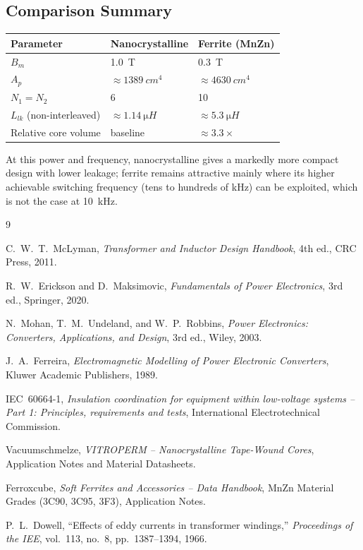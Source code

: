 \documentclass[11pt,a4paper]{article}
\begin{document}
\subsection*{Comparison Summary}
\begin{center}
\begin{tabular}{@{}lll@{}}
\toprule
Parameter & Nanocrystalline & Ferrite (MnZn) \\
\midrule
$B_m$ & \SI{1.0}{T} & \SI{0.3}{T} \\
$A_p$ & $\approx\SI{1389}{cm^4}$ & $\approx\SI{4630}{cm^4}$ \\
$N_1=N_2$ & 6 & 10 \\
$L_{lk}$ (non-interleaved) & $\approx\SI{1.14}{\micro H}$ & $\approx\SI{5.3}{\micro H}$ \\
Relative core volume & baseline & $\approx 3.3\times$ \\
\bottomrule
\end{tabular}
\end{center}
At this power and frequency, nanocrystalline gives a markedly more compact
design with lower leakage; ferrite remains attractive mainly where its higher
achievable switching frequency (tens to hundreds of kHz) can be exploited, which
is not the case at \SI{10}{kHz}.

\begin{thebibliography}{9}

C.~W.~T.~McLyman, \textit{Transformer and Inductor Design Handbook}, 4th ed.,
CRC Press, 2011.

R.~W.~Erickson and D.~Maksimovic, \textit{Fundamentals of Power Electronics},
3rd ed., Springer, 2020.

N.~Mohan, T.~M.~Undeland, and W.~P.~Robbins, \textit{Power Electronics:
Converters, Applications, and Design}, 3rd ed., Wiley, 2003.

J.~A.~Ferreira, \textit{Electromagnetic Modelling of Power Electronic
Converters}, Kluwer Academic Publishers, 1989.

IEC~60664-1, \textit{Insulation coordination for equipment within low-voltage
systems -- Part 1: Principles, requirements and tests}, International
Electrotechnical Commission.

Vacuumschmelze, \textit{VITROPERM -- Nanocrystalline Tape-Wound Cores},
Application Notes and Material Datasheets.

Ferroxcube, \textit{Soft Ferrites and Accessories -- Data Handbook}, MnZn
Material Grades (3C90, 3C95, 3F3), Application Notes.

P.~L.~Dowell, ``Effects of eddy currents in transformer windings,'' \textit{
Proceedings of the IEE}, vol.~113, no.~8, pp.~1387--1394, 1966.

\end{thebibliography}
\end{document}
